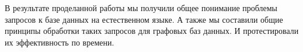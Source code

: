\Conclusion %
В результате проделанной работы мы получили общее понимание проблемы запросов к базе данных на естественном языке. А также мы составили общие принципы обработки таких запросов для графовых баз данных. И протестировали их эффективность по времени.

